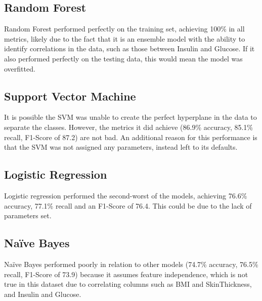 \documentclass[12pt]{report}
\newcommand{\para}{\vspace{8pt}\noindent}
\begin{document}

\subsection{Random Forest}
Random Forest performed perfectly on the training set, achieving 100\% in all metrics, likely due to the fact that it is an ensemble model 
with the ability to identify correlations in the data, such as those between Insulin and Glucose. If it also performed perfectly on the testing
data, this would mean the model was overfitted.

\subsection{Support Vector Machine}
It is possible the SVM was unable to create the perfect hyperplane in the data to separate the classes. However, 
the metrics it did achieve (86.9\% accuracy, 85.1\% recall, F1-Score of 87.2) are not bad. An additional reason 
for this performance is that the SVM was not assigned any parameters, instead left to its defaults.

\subsection{Logistic Regression}
Logistic regression performed the second-worst of the models, achieving 76.6\% accuracy, 77.1\% recall and an F1-Score 
of 76.4. This could be due to the lack of parameters set.

\subsection{Na\"ive Bayes}
Na\"ive Bayes performed poorly in relation to other models (74.7\% accuracy, 76.5\% recall, F1-Score of 73.9) because it assumes feature independence,
which is not true in this dataset due to correlating columns such as BMI and SkinThickness, and Insulin and Glucose.
\end{document}
